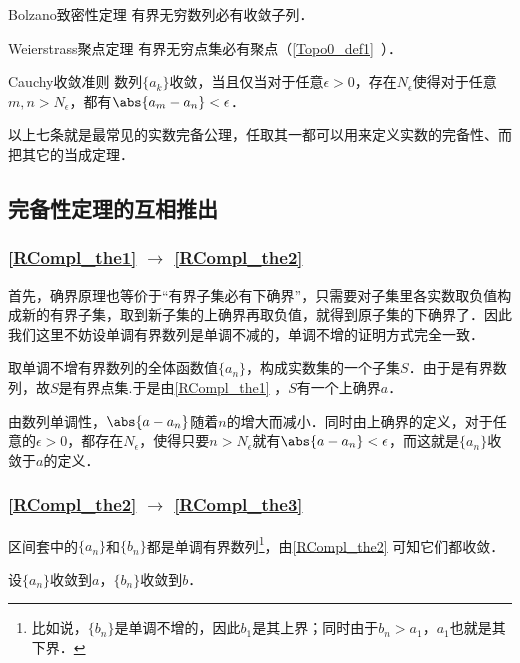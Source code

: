 \begin{theorem}{Bolzano致密性定理}\label{RCompl_the5}
有界无穷数列必有收敛子列．
\end{theorem}

\begin{theorem}{Weierstrass聚点定理}\label{RCompl_the6}
有界无穷点集必有聚点（\autoref{Topo0_def1}~）．
\end{theorem}

\begin{theorem}{Cauchy收敛准则}\label{RCompl_the7}
数列$\{a_k\}$收敛，当且仅当对于任意$\epsilon>0$，存在$N_\epsilon$使得对于任意$m, n>N_\epsilon$，都有$\abs{a_m-a_n}<\epsilon$．
\end{theorem}

以上七条就是最常见的实数完备公理，任取其一都可以用来定义实数的完备性、而把其它的当成定理．

\subsection{完备性定理的互相推出}

\subsubsection{\autoref{RCompl_the1} $\to$ \autoref{RCompl_the2} }

首先，确界原理也等价于“有界子集必有下确界”，只需要对子集里各实数取负值构成新的有界子集，取到新子集的上确界再取负值，就得到原子集的下确界了．因此我们这里不妨设单调有界数列是单调不减的，单调不增的证明方式完全一致．

取单调不增有界数列的全体函数值$\{a_n\}$，构成实数集的一个子集$S$．由于是有界数列，故$S$是有界点集.于是由\autoref{RCompl_the1} ，$S$有一个上确界$a$．

由数列单调性，$\abs{a-a_n}$随着$n$的增大而减小．同时由上确界的定义，对于任意的$\epsilon>0$，都存在$N_\epsilon$，使得只要$n>N_\epsilon$就有$\abs{a-a_n}<\epsilon$，而这就是$\{a_n\}$收敛于$a$的定义．

\subsubsection{\autoref{RCompl_the2} $\to$ \autoref{RCompl_the3} }

区间套中的$\{a_n\}$和$\{b_n\}$都是单调有界数列\footnote{比如说，$\{b_n\}$是单调不增的，因此$b_1$是其上界；同时由于$b_n>a_1$，$a_1$也就是其下界．}，由\autoref{RCompl_the2} 可知它们都收敛．

设$\{a_n\}$收敛到$a$，$\{b_n\}$收敛到$b$．


